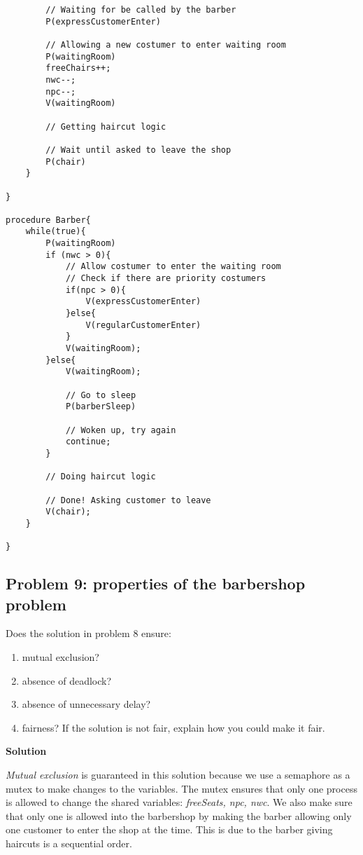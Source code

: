 \begin{lstlisting}
        // Waiting for be called by the barber
        P(expressCustomerEnter)

        // Allowing a new costumer to enter waiting room
        P(waitingRoom)
        freeChairs++;
        nwc--; 
        npc--;
        V(waitingRoom)

        // Getting haircut logic 

        // Wait until asked to leave the shop 
        P(chair)
    }

}

procedure Barber{
    while(true){
        P(waitingRoom)
        if (nwc > 0){
            // Allow costumer to enter the waiting room    
            // Check if there are priority costumers 
            if(npc > 0){
                V(expressCustomerEnter)
            }else{
                V(regularCustomerEnter)
            }
            V(waitingRoom);
        }else{
            V(waitingRoom);

            // Go to sleep
            P(barberSleep)

            // Woken up, try again
            continue;
        }

        // Doing haircut logic

        // Done! Asking customer to leave
        V(chair);
    }

}

\end{lstlisting}


\subsection{Problem 9: properties of the barbershop problem}

Does the solution in problem 8 ensure: 

\begin{enumerate}
    \item mutual exclusion?
    \item absence of deadlock?
    \item absence of unnecessary delay? 
    \item fairness? If the solution is not fair, explain how you could make it fair.
\end{enumerate}

\textbf{Solution}

\textit{Mutual exclusion} is guaranteed in this solution because we use a semaphore as a mutex to make changes to the variables. 
The mutex ensures that only one process is allowed to change the shared variables: \textit{freeSeats, npc, nwc}. 
We also make sure that only one is allowed into the barbershop by making the barber allowing only one customer to enter the shop at the time. 
This is due to the barber giving haircuts is a sequential order. \\


